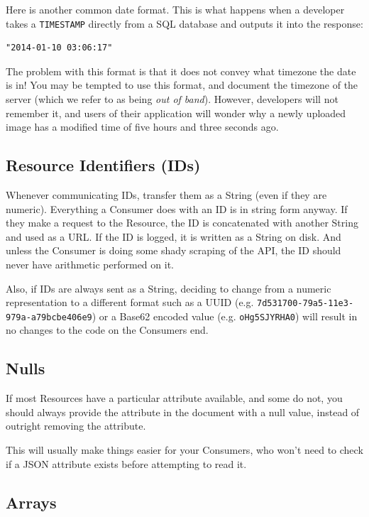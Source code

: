 \documentclass{book}
\begin{document}
Here is another common date format. This is what happens when a developer takes a \texttt{TIMESTAMP} directly from a SQL database and outputs it into the response:

\begin{verbatim}
"2014-01-10 03:06:17"
\end{verbatim}

The problem with this format is that it does not convey what timezone the date is in! You may be tempted to use this format, and document the timezone of the server (which we refer to as being \emph{out of band}). However, developers will not remember it, and users of their application will wonder why a newly uploaded image has a modified time of five hours and three seconds ago.

\subsection{Resource Identifiers (IDs)}

Whenever communicating IDs, transfer them as a String (even if they are numeric). Everything a Consumer does with an ID is in string form anyway. If they make a request to the Resource, the ID is concatenated with another String and used as a URL. If the ID is logged, it is written as a String on disk. And unless the Consumer is doing some shady scraping of the API, the ID should never have arithmetic performed on it.

Also, if IDs are always sent as a String, deciding to change from a numeric representation to a different format such as a UUID (e.g. \texttt{7d531700-79a5-11e3-979a-a79bcbe406e9}) or a Base62 encoded value (e.g. \texttt{oHg5SJYRHA0}) will result in no changes to the code on the Consumers end.

\subsection{Nulls}

If most Resources have a particular attribute available, and some do not, you should always provide the attribute in the document with a null value, instead of outright removing the attribute.

This will usually make things easier for your Consumers, who won't need to check if a JSON attribute exists before attempting to read it.

\subsection{Arrays}
\end{document}
